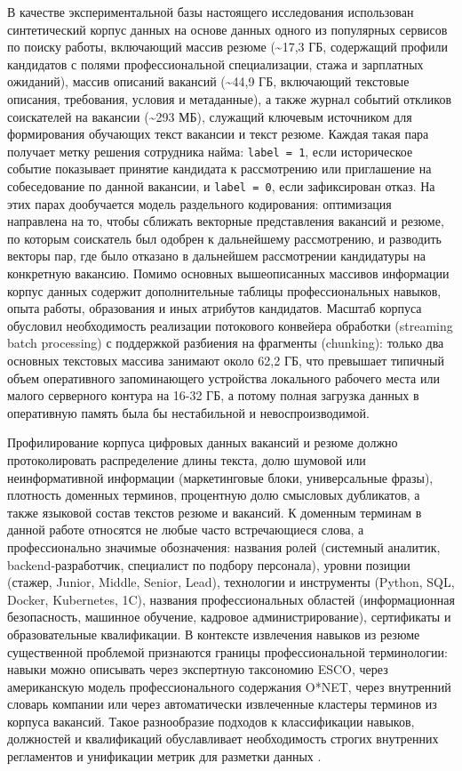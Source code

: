 В качестве экспериментальной базы настоящего исследования использован синтетический корпус данных на основе данных одного из популярных сервисов по поиску работы, включающий массив резюме (\textasciitilde{}17,3 ГБ, содержащий профили кандидатов с полями профессиональной специализации, стажа и зарплатных ожиданий), массив описаний вакансий (\textasciitilde{}44,9 ГБ, включающий текстовые описания, требования, условия и метаданные), а также журнал событий откликов соискателей на вакансии (\textasciitilde{}293 МБ), служащий ключевым источником для формирования обучающих текст вакансии и текст резюме. Каждая такая пара получает метку решения сотрудника найма: \texttt{label = 1}, если историческое событие показывает принятие кандидата к рассмотрению или приглашение на собеседование по данной вакансии, и \texttt{label = 0}, если зафиксирован отказ. На этих парах дообучается модель раздельного кодирования: оптимизация направлена на то, чтобы сближать векторные представления вакансий и резюме, по которым соискатель был одобрен к дальнейшему рассмотрению, и разводить векторы пар, где было отказано в дальнейшем рассмотрении кандидатуры на конкретную вакансию. Помимо основных вышеописанных массивов информации корпус данных содержит дополнительные таблицы профессиональных навыков, опыта работы, образования и иных атрибутов кандидатов. Масштаб корпуса обусловил необходимость реализации потокового конвейера обработки (streaming batch processing) с поддержкой разбиения на фрагменты (chunking): только два основных текстовых массива занимают около 62,2 ГБ, что превышает типичный объем оперативного запоминающего устройства локального рабочего места или малого серверного контура на 16-32 ГБ, а потому полная загрузка данных в оперативную память была бы нестабильной и невоспроизводимой.

Профилирование корпуса цифровых данных вакансий и резюме должно протоколировать распределение длины текста, долю шумовой или неинформативной информации (маркетинговые блоки, универсальные фразы), плотность доменных терминов, процентную долю смысловых дубликатов, а также языковой состав текстов резюме и вакансий. К доменным терминам в данной работе относятся не любые часто встречающиеся слова, а профессионально значимые обозначения: названия ролей (системный аналитик, backend-разработчик, специалист по подбору персонала), уровни позиции (стажер, Junior, Middle, Senior, Lead), технологии и инструменты (Python, SQL, Docker, Kubernetes, 1C), названия профессиональных областей (информационная безопасность, машинное обучение, кадровое администрирование), сертификаты и образовательные квалификации. В контексте извлечения навыков из резюме существенной проблемой признаются границы профессиональной терминологии: навыки можно описывать через экспертную таксономию ESCO, через американскую модель профессионального содержания O*NET, через внутренний словарь компании или через автоматически извлеченные кластеры терминов из корпуса вакансий. Такое разнообразие подходов к классификации навыков, должностей и квалификаций обуславливает необходимость строгих внутренних регламентов и унификации метрик для разметки данных \cite{src18, src30, src31}.

